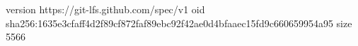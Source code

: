 version https://git-lfs.github.com/spec/v1
oid sha256:1635e3cfaff4d2f89cf872faf89ebc92f42ae0d4bfaaec15fd9c660659954a95
size 5566

